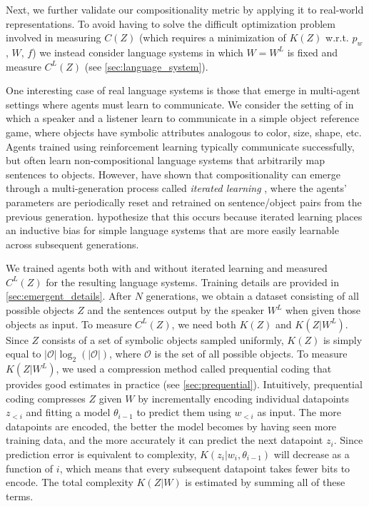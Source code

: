 \documentclass{article} %
\begin{document}
Next, we further validate our compositionality metric by applying it to real-world representations. To avoid having to solve the difficult optimization problem involved in measuring $C(Z)$ (which requires a minimization of $K(Z)$ w.r.t. $p_w$, $W$, $f$) we instead consider language systems in which $W = W^L$ is fixed and measure $C^L(Z)$ (see \cref{sec:language_system}).

One interesting case of real language systems is those that emerge in multi-agent settings where agents must learn to communicate. We consider the setting of \citet{li2019ease,ren2020compositional} in which a speaker and a listener learn to communicate in a simple object reference game, where objects have symbolic attributes analogous to color, size, shape, etc. Agents trained using reinforcement learning typically communicate successfully, but often learn non-compositional language systems that arbitrarily map sentences to objects. However, \citet{li2019ease,ren2020compositional} have shown that compositionality can emerge through a multi-generation process called \textit{iterated learning} \citep{kirby2015compression}, where the agents' parameters are periodically reset and retrained on sentence/object pairs from the previous generation. \citet{kirby2015compression} hypothesize that this occurs because iterated learning places an inductive bias for simple language systems that are more easily learnable across subsequent generations.

We trained agents both with and without iterated learning and measured $C^L(Z)$ for the resulting language systems. Training details are provided in \cref{sec:emergent_details}. After $N$ generations, we obtain a dataset consisting of all possible objects $Z$ and the sentences output by the speaker $W^L$ when given those objects as input. To measure $C^L(Z)$, we need both $K(Z)$ and $K(Z|W^L)$. Since $Z$ consists of a set of symbolic objects sampled uniformly, $K(Z)$ is simply equal to $|\mathcal{O}|\log_2(|\mathcal{O}|)$, where $\mathcal{O}$ is the set of all possible objects. To measure $K(Z|W^L)$, we used a compression method called prequential coding \citep{blier2018description} that provides good estimates in practice (see \cref{sec:prequential}). Intuitively, prequential coding compresses $Z$ given $W$ by incrementally encoding individual datapoints $z_{<i}$ and fitting a model $\theta_{i-1}$ to predict them using $w_{<i}$ as input. The more datapoints are encoded, the better the model becomes by having seen more training data, and the more accurately it can predict the next datapoint $z_i$. Since prediction error is equivalent to complexity, $K(z_i|w_i, \theta_{i-1})$ will decrease as a function of $i$, which means that every subsequent datapoint takes fewer bits to encode. The total complexity $K(Z|W)$ is estimated by summing all of these terms.
\end{document}
